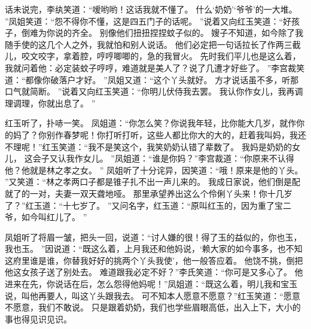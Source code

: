 话未说完，李纨笑道：“嗳哟哟！这话我就不懂了。
什么‘奶奶’‘爷爷’的一大堆。
”凤姐笑道：“怨不得你不懂，这是四五门子的话呢。
”说着又向红玉笑道：“好孩子，倒难为你说的齐全。
别像他们扭扭捏捏蚊子似的。
嫂子不知道，如今除了我随手使的这几个人之外，我就怕和别人说话。
他们必定把一句话拉长了作两三截儿，咬文咬字，拿着腔，哼哼唧唧的，急的我冒火。
先时我们平儿也是这么着，我就问着他：必定装蚊子哼哼，难道就是美人了？说了几遭才好些了。
”李宫裁笑道：“都像你破落户才好。
”凤姐又道：“这个丫头就好。
方才说话虽不多，听那口气就简断。
”说着又向红玉笑道：“你明儿伏侍我去罢。
我认你作女儿，我再调理调理，你就出息了。
”\par
红玉听了，扑哧一笑。
凤姐道：“你怎么笑？你说我年轻，比你能大几岁，就作你的妈了？你别作春梦呢！你打听打听，这些人都比你大的大的，赶着我叫妈，我还不理呢！”红玉笑道：“我不是笑这个，我笑奶奶认错了辈数了。
我妈是奶奶的女儿，
这会子又认我作女儿。
”凤姐道：“谁是你妈？”李宫裁道：“你原来不认得他？他就是林之孝之女。
”
凤姐听了十分诧异，因笑道：“哦！原来是他的丫头。
”又笑道：“林之孝两口子都是锥子扎不出一声儿来的。
我成日家说，他们倒是配就了的一对，夫妻一双天聋地哑。
那里承望养出这么个伶俐丫头来！你十几岁了？”红玉道：“十七岁了。
”又问名字，红玉道：“原叫红玉的，因为重了宝二爷，如今叫红儿了。
”\par
凤姐听了将眉一皱，把头一回，说道：“讨人嫌的很！得了玉的益似的，你也玉，我也玉。
”因说道：“既这么着，上月我还和他妈说，‘赖大家的如今事多，也不知这府里谁是谁，你替我好好的挑两个丫头我使’，他一般答应着。
他饶不挑，倒把他这女孩子送了别处去。
难道跟我必定不好？”李氏笑道：“你可是又多心了。
他进来在先，你说话在后，怎么怨得他妈呢！”凤姐道：“既这么着，明儿我和宝玉说，叫他再要人，叫这丫头跟我去。
可不知本人愿意不愿意？”红玉笑道：“愿意不愿意，我们不敢说。
只是跟着奶奶，我们也学些眉眼高低，出入上下，大小的事也得见识见识。
